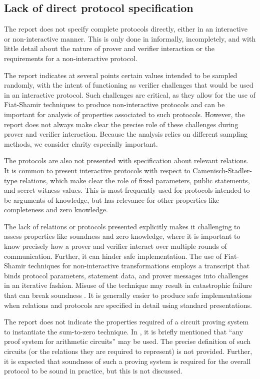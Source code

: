 \documentclass{article}
\begin{document}
\subsection{Lack of direct protocol specification}

The report does not specify complete protocols directly, either in an interactive or non-interactive manner.
This is only done in \cite{ecip} informally, incompletely, and with little detail about the nature of prover and verifier interaction or the requirements for a non-interactive protocol.

The report indicates at several points certain values intended to be sampled randomly, with the intent of functioning as verifier challenges that would be used in an interactive protocol.
Such challenges are critical, as they allow for the use of Fiat-Shamir techniques to produce non-interactive protocols and can be important for analysis of properties associated to such protocols.
However, the report does not always make clear the precise role of these challenges during prover and verifier interaction.
Because the analysis relies on different sampling methods, we consider clarity especially important.

The protocols are also not presented with specification about relevant relations.
It is common to present interactive protocols with respect to Camenisch-Stadler-type relations, which make clear the role of fixed parameters, public statements, and secret witness values.
This is most frequently used for protocols intended to be arguments of knowledge, but has relevance for other properties like completeness and zero knowledge.

The lack of relations or protocols presented explicitly makes it challenging to assess properties like soundness and zero knowledge, where it is important to know precisely how a prover and verifier interact over multiple rounds of communication.
Further, it can hinder safe implementation.
The use of Fiat-Shamir techniques for non-interactive transformations employs a transcript that binds protocol parameters, statement data, and prover messages into challenges in an iterative fashion.
Misuse of the technique may result in catastrophic failure that can break soundness \cite{fs, weak_fs}.
It is generally easier to produce safe implementations when relations and protocols are specified in detail using standard presentations.

The report does not indicate the properties required of a circuit proving system to instantiate the sum-to-zero technique.
In \cite{ecip}, it is briefly mentioned that ``any proof system for arithmetic circuits'' may be used.
The precise definition of such circuits (or the relations they are required to represent) is not provided.
Further, it is expected that soundness of such a proving system is required for the overall protocol to be sound in practice, but this is not discussed.
\end{document}
